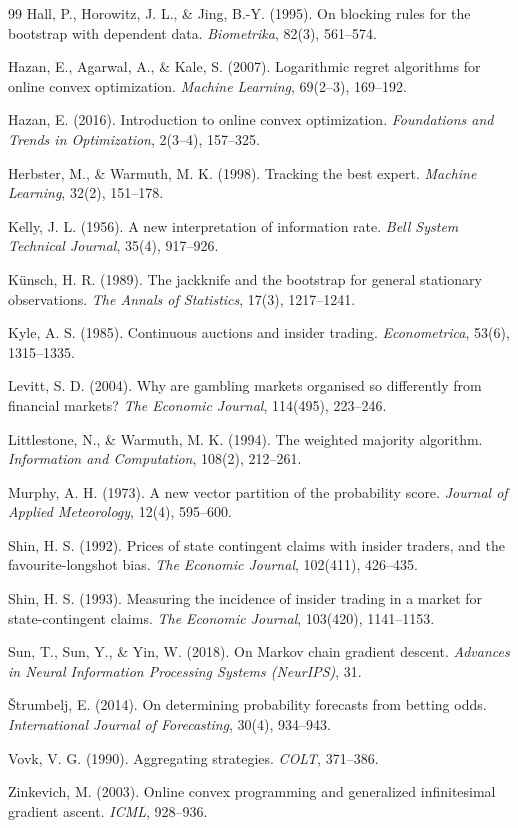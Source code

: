 \documentclass[12pt,a4paper,oneside]{report}
\renewcommand{\_}{\oldunderscore\allowbreak}
\theoremstyle{definition}
\theoremstyle{plain}
\theoremstyle{remark}
\begin{document}
\begin{thebibliography}{99}
 Hall, P., Horowitz, J. L., \& Jing, B.-Y. (1995). On blocking rules for
the bootstrap with dependent data. \emph{Biometrika}, 82(3), 561--574.

 Hazan, E., Agarwal, A., \& Kale, S. (2007). Logarithmic regret
algorithms for online convex optimization. \emph{Machine Learning}, 69(2--3), 169--192.

 Hazan, E. (2016). Introduction to online convex optimization.
\emph{Foundations and Trends in Optimization}, 2(3--4), 157--325.

 Herbster, M., \& Warmuth, M. K. (1998). Tracking the best expert.
\emph{Machine Learning}, 32(2), 151--178.

 Kelly, J. L. (1956). A new interpretation of information rate.
\emph{Bell System Technical Journal}, 35(4), 917--926.

 Künsch, H. R. (1989). The jackknife and the bootstrap for general
stationary observations. \emph{The Annals of Statistics}, 17(3), 1217--1241.

 Kyle, A. S. (1985). Continuous auctions and insider trading.
\emph{Econometrica}, 53(6), 1315--1335.

 Levitt, S. D. (2004). Why are gambling markets organised so differently
from financial markets? \emph{The Economic Journal}, 114(495), 223--246.

 Littlestone, N., \& Warmuth, M. K. (1994). The weighted majority
algorithm. \emph{Information and Computation}, 108(2), 212--261.

 Murphy, A. H. (1973). A new vector partition of the probability score.
\emph{Journal of Applied Meteorology}, 12(4), 595--600.

 Shin, H. S. (1992). Prices of state contingent claims with insider traders,
and the favourite-longshot bias. \emph{The Economic Journal}, 102(411), 426--435.

 Shin, H. S. (1993). Measuring the incidence of insider trading in a market
for state-contingent claims. \emph{The Economic Journal}, 103(420), 1141--1153.

 Sun, T., Sun, Y., \& Yin, W. (2018). On Markov chain gradient descent.
\emph{Advances in Neural Information Processing Systems (NeurIPS)}, 31.

 Štrumbelj, E. (2014). On determining probability forecasts from
betting odds. \emph{International Journal of Forecasting}, 30(4), 934--943.

 Vovk, V. G. (1990). Aggregating strategies. \emph{COLT}, 371--386.

 Zinkevich, M. (2003). Online convex programming and generalized
infinitesimal gradient ascent. \emph{ICML}, 928--936.

\end{thebibliography}
\end{document}
